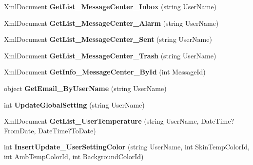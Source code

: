 \begin{DoxyCompactItemize}
\item 
\hypertarget{class_data_service_aead21b3a7efd2a8287a5dd058d7aacd1}{Xml\-Document {\bfseries Get\-List\-\_\-\-Message\-Center\-\_\-\-Inbox} (string User\-Name)}\label{class_data_service_aead21b3a7efd2a8287a5dd058d7aacd1}

\item 
\hypertarget{class_data_service_ac271a75705166538f296173d3e999e6f}{Xml\-Document {\bfseries Get\-List\-\_\-\-Message\-Center\-\_\-\-Alarm} (string User\-Name)}\label{class_data_service_ac271a75705166538f296173d3e999e6f}

\item 
\hypertarget{class_data_service_a93139d269b2daddec457d61f89ce5008}{Xml\-Document {\bfseries Get\-List\-\_\-\-Message\-Center\-\_\-\-Sent} (string User\-Name)}\label{class_data_service_a93139d269b2daddec457d61f89ce5008}

\item 
\hypertarget{class_data_service_a8b482a47bc69c39b68a22d8298e6ace7}{Xml\-Document {\bfseries Get\-List\-\_\-\-Message\-Center\-\_\-\-Trash} (string User\-Name)}\label{class_data_service_a8b482a47bc69c39b68a22d8298e6ace7}

\item 
\hypertarget{class_data_service_a2fe4c1b40a299fd6fb5417f7cc1787df}{Xml\-Document {\bfseries Get\-Info\-\_\-\-Message\-Center\-\_\-\-By\-Id} (int Message\-Id)}\label{class_data_service_a2fe4c1b40a299fd6fb5417f7cc1787df}

\item 
\hypertarget{class_data_service_a89b2572b09a4b06c819f32c51c6a7983}{object {\bfseries Get\-Email\-\_\-\-By\-User\-Name} (string User\-Name)}\label{class_data_service_a89b2572b09a4b06c819f32c51c6a7983}

\item 
\hypertarget{class_data_service_ae2677cfdaa434fc5ebf1badd69d2c42b}{int {\bfseries Update\-Global\-Setting} (string User\-Name)}\label{class_data_service_ae2677cfdaa434fc5ebf1badd69d2c42b}

\item 
\hypertarget{class_data_service_a685a1941155b29f565f23b3accda2a8b}{Xml\-Document {\bfseries Get\-List\-\_\-\-User\-Temperature} (string User\-Name, Date\-Time?From\-Date, Date\-Time?To\-Date)}\label{class_data_service_a685a1941155b29f565f23b3accda2a8b}

\item 
\hypertarget{class_data_service_aff17bd0838bf8a0259193339cbb41115}{int {\bfseries Insert\-Update\-\_\-\-User\-Setting\-Color} (string User\-Name, int Skin\-Temp\-Color\-Id, int Amb\-Temp\-Color\-Id, int Background\-Color\-Id)}\label{class_data_service_aff17bd0838bf8a0259193339cbb41115}


\end{DoxyCompactItemize}
